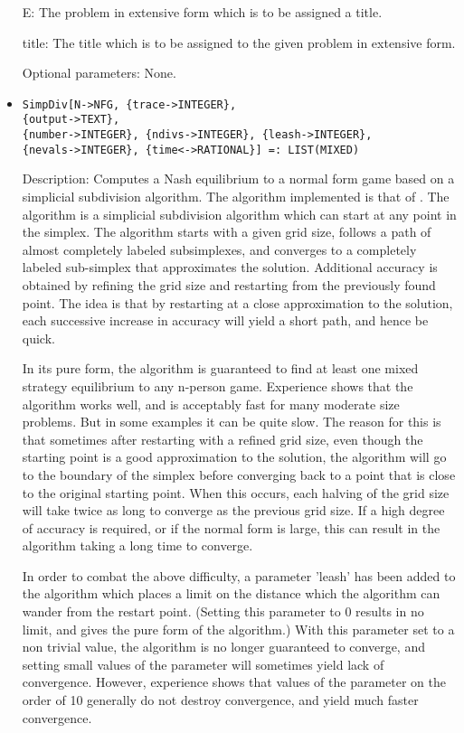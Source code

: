 \begin{itemize}
\bd
\item
[E:] The problem in extensive form which is to be assigned a title.
\item
[title:] The title which is to be assigned to the given problem in
extensive form.
\ed

\item
[Optional parameters:] None.
\ed

\item
\protect \large \begin{verbatim}
SimpDiv[N->NFG, {trace->INTEGER},
{output->TEXT},
{number->INTEGER}, {ndivs->INTEGER}, {leash->INTEGER},
{nevals->INTEGER}, {time<->RATIONAL}] =: LIST(MIXED)
\end{verbatim}\normalsize

\bd
\item
[Description:] Computes a Nash equilibrium to a normal form game based
on a simplicial subdivision algorithm.  The algorithm implemented is
that of \cite{VTH:1987}.  The 
algorithm is a simplicial subdivision algorithm which can start at any
point in the simplex.  The algorithm starts with a given grid size,
follows a path of almost completely labeled subsimplexes, and
converges to a completely labeled sub-simplex that approximates the
solution.  Additional accuracy is obtained by refining the grid size
and restarting from the previously found point.  The idea is that by
restarting at a close approximation to the solution, each successive
increase in accuracy will yield a short path, and hence be quick.

In its pure form, the algorithm is guaranteed to find at least one
mixed strategy equilibrium to any n-person game.  Experience shows
that the algorithm works well, and is acceptably fast for many
moderate size problems.  But in some examples it can be quite slow.
The reason for this is that sometimes after restarting with a refined
grid size, even though the starting point is a good approximation to
the solution, the algorithm will go to the boundary of the simplex
before converging back to a point that is close to the original
starting point.  When this occurs, each halving of the grid size will
take twice as long to converge as the previous grid size.  If a high
degree of accuracy is required, or if the normal form is large, this
can result in the algorithm taking a long time to converge.

In order to combat the above difficulty, a parameter 'leash' has been
added to the algorithm which places a limit on the distance which the
algorithm can wander from the restart point. (Setting this parameter
to 0 results in no limit, and gives the pure form of the algorithm.)
With this parameter set to a non trivial value, the algorithm is no
longer guaranteed to converge, and setting small values of the
parameter will sometimes yield lack of convergence.  However,
experience shows that values of the parameter on the order of 10
generally do not destroy convergence, and yield much faster
convergence.


\end{itemize}
